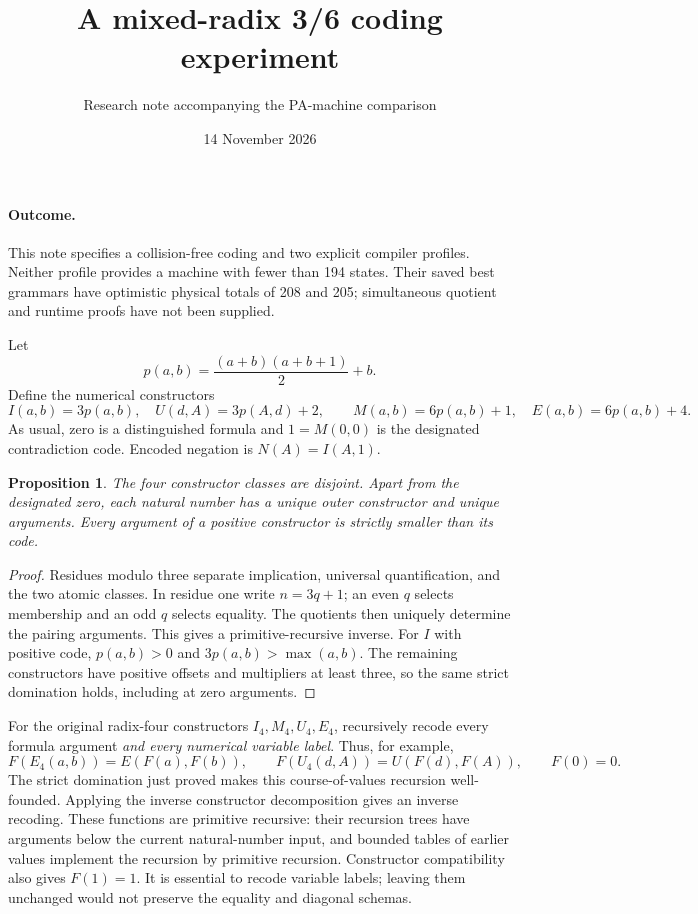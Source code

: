 \documentclass[11pt]{article}
\title{A mixed-radix 3/6 coding experiment}
\author{Research note accompanying the PA-machine comparison}
\date{14 November 2026}
\newtheorem{proposition}{Proposition}
\begin{document}
\maketitle

\paragraph{Outcome.}
This note specifies a collision-free coding and two explicit compiler profiles.
Neither profile provides a machine with fewer than 194 states. Their saved
best grammars have optimistic physical totals of 208 and 205; simultaneous
quotient and runtime proofs have not been supplied.

Let
\[
 p(a,b)=\frac{(a+b)(a+b+1)}2+b.
\]
Define the numerical constructors
\[
 I(a,b)=3p(a,b),\quad U(d,A)=3p(A,d)+2,\qquad
 M(a,b)=6p(a,b)+1,\quad E(a,b)=6p(a,b)+4.
\]
As usual, zero is a distinguished formula and $1=M(0,0)$ is the designated
contradiction code. Encoded negation is $N(A)=I(A,1)$.

\begin{proposition}
The four constructor classes are disjoint. Apart from the designated zero,
each natural number has a unique outer constructor and unique arguments.
Every argument of a positive constructor is strictly smaller than its code.
\end{proposition}
\begin{proof}
Residues modulo three separate implication, universal quantification, and
the two atomic classes. In residue one write $n=3q+1$; an even $q$ selects
membership and an odd $q$ selects equality. The quotients then uniquely
determine the pairing arguments. This gives a primitive-recursive inverse.
For $I$ with positive code, $p(a,b)>0$ and $3p(a,b)>\max(a,b)$.
The remaining constructors have positive offsets and multipliers at least
three, so the same strict domination holds, including at zero arguments.
\end{proof}

For the original radix-four constructors $I_4,M_4,U_4,E_4$, recursively
recode every formula argument \emph{and every numerical variable label}.
Thus, for example,
\[
 F(E_4(a,b))=E(F(a),F(b)),\qquad
 F(U_4(d,A))=U(F(d),F(A)),\qquad F(0)=0.
\]
The strict domination just proved makes this course-of-values recursion
well-founded. Applying the inverse constructor decomposition gives an inverse
recoding. These functions are primitive recursive: their recursion trees have
arguments below the current natural-number input, and bounded tables of earlier
values implement the recursion by primitive recursion. Constructor compatibility
also gives $F(1)=1$. It is essential to recode variable labels; leaving them
unchanged would not preserve the equality and diagonal schemas.
\end{document}
